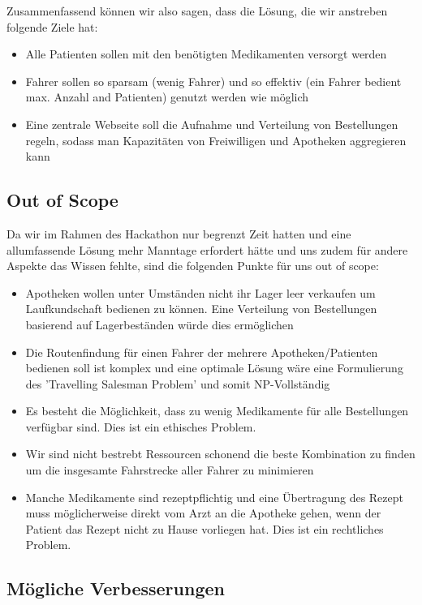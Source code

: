 \documentclass[a4]{article}
\begin{document}
Zusammenfassend können wir also sagen, dass die Lösung, die wir anstreben folgende Ziele hat:

\begin{itemize}
\item Alle Patienten sollen mit den benötigten Medikamenten versorgt werden
\item Fahrer sollen so sparsam (wenig Fahrer) und so effektiv (ein Fahrer bedient max. Anzahl and Patienten) genutzt werden wie möglich
\item Eine zentrale Webseite soll die Aufnahme und Verteilung von Bestellungen regeln, sodass man Kapazitäten von Freiwilligen und Apotheken aggregieren kann
\end{itemize}

\subsection{Out of Scope}

Da wir im Rahmen des Hackathon nur begrenzt Zeit hatten und eine allumfassende Lösung mehr Manntage erfordert hätte und uns zudem für andere Aspekte das Wissen fehlte, sind die folgenden Punkte für uns out of scope:

\begin{itemize}
\item Apotheken wollen unter Umständen nicht ihr Lager leer verkaufen um Laufkundschaft bedienen zu können. Eine Verteilung von Bestellungen basierend auf Lagerbeständen würde dies ermöglichen
\item Die Routenfindung für einen Fahrer der mehrere Apotheken/Patienten bedienen soll ist komplex und eine optimale Lösung wäre eine Formulierung des 'Travelling Salesman Problem' und somit NP-Vollständig
\item Es besteht die Möglichkeit, dass zu wenig Medikamente für alle Bestellungen verfügbar sind. Dies ist ein ethisches Problem.
\item Wir sind nicht bestrebt Ressourcen schonend die beste Kombination zu finden um die insgesamte Fahrstrecke aller Fahrer zu minimieren
\item Manche Medikamente sind rezeptpflichtig und eine Übertragung des Rezept muss möglicherweise direkt vom Arzt an die Apotheke gehen, wenn der Patient das Rezept nicht zu Hause vorliegen hat. Dies ist ein rechtliches Problem.
\end{itemize}

\subsection{Mögliche Verbesserungen}
\end{document}
